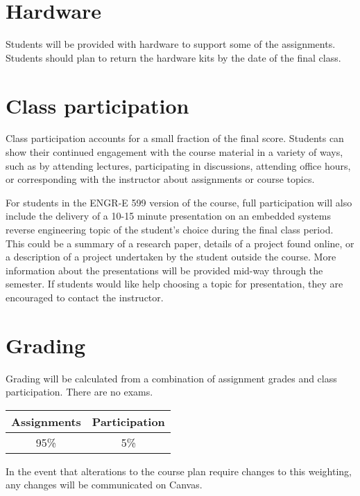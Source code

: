 \documentclass[12pt,twoside]{article}
\renewcommand\_{\textunderscore\allowbreak}
\begin{document}
\section{Hardware}

Students will be provided with hardware to support some of the assignments.
Students should plan to return the hardware kits by the date of the final
class.

\section{Class participation}

Class participation accounts for a small fraction of the final score. Students
can show their continued engagement with the course material in a variety of
ways, such as by attending lectures, participating in discussions, attending
office hours, or corresponding with the instructor about assignments or course
topics.

For students in the ENGR-E 599 version of the course, full participation will
also include the delivery of a 10-15 minute presentation on an embedded systems
reverse engineering topic of the student's choice during the final class
period. This could be a summary of a research paper, details of a project found
online, or a description of a project undertaken by the student outside the
course. More information about the presentations will be provided mid-way
through the semester. If students would like help choosing a topic for
presentation, they are encouraged to contact the instructor.

\section{Grading}

Grading will be calculated from a combination of assignment grades and class
participation. There are no exams.

\begin{center}
\renewcommand{\arraystretch}{1.5}
\begin{tabular}{|c|c|}
\hline
{\bf Assignments} & {\bf Participation} \\
\hline
95\% & 5\% \\
\hline
\end{tabular}
\end{center}

In the event that alterations to the course plan require changes to this
weighting, any changes will be communicated on Canvas.
\end{document}
